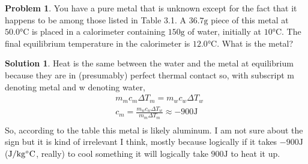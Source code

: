 \documentclass[10pt]{article}
\theoremstyle{definition}
\newtheorem{problem}{Problem}
\newtheorem{soln}{Solution}
\begin{document}
\begin{problem}
You have a pure metal that is unknown except for the fact that it happens to be among those listed in Table 3.1. A $36.7\unit{\gram}$ piece of this metal
at $50.0\unit{\celsius}$ is placed in a calorimeter containing $150\unit{\gram}$ of water, initially at $10\unit{\celsius}$. The final equilibrium temperature in the calorimeter is $12.0\unit{\celsius}$.
What is the metal?
\end{problem}
\begin{soln}
  Heat is the same between the water and the metal at equilibrium because they are in (presumably) perfect thermal contact so, with subscript m denoting metal and w denoting water,
  \begin{align*}
     & m_mc_m\Delta T_m=m_wc_w\Delta T_w                                  \\
     & c_m=\frac{m_wc_w\Delta T_w}{m_m\Delta T_m}\approx-900\unit{\joule} \\
  \end{align*}
  So, according to the table this metal is likely aluminum. I am not sure about the sign but it is kind of irrelevant I think, mostly because logically if it takes $-900\unit{\joule}$ ($\unit{\joule\per{\kilogram\celsius}}$, really) to cool
  something it will logically take $900\unit{\joule}$ to heat it up.
\end{soln}
\end{document}
